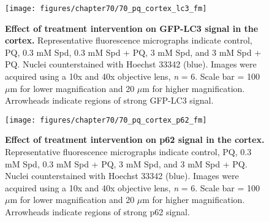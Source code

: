 \begin{landscape}
\begin{figure}[!htbp]
\center
  \texttt{[image: figures/chapter70/70\_pq\_cortex\_lc3\_fm]}
  \caption[Effect of treatment intervention on GFP-LC3 signal in the cortex]{\textbf{Effect of treatment intervention on GFP-LC3 signal in the cortex.} Representative fluorescence micrographs indicate control, PQ, 0.3 mM Spd, 0.3 mM Spd + PQ, 3 mM Spd, and 3 mM Spd + PQ. Nuclei counterstained with Hoechst 33342 (blue). Images were acquired using a 10x and 40x objective lens, \textit{n} = 6. Scale bar = 100 $\mu$m for lower magnification and 20 $\mu$m for higher magnification. Arrowheads indicate regions of strong GFP-LC3 signal.}
  \label{fig:70_pq_cortex_lc3_fm}
\end{figure} 
\end{landscape}

\begin{landscape}
\begin{figure}[!htbp]
\center
  \texttt{[image: figures/chapter70/70\_pq\_cortex\_p62\_fm]}
  \caption[Effect of treatment intervention on p62 signal in the cortex]{\textbf{Effect of treatment intervention on p62 signal in the cortex.} Representative fluorescence micrographs indicate control, PQ, 0.3 mM Spd, 0.3 mM Spd + PQ, 3 mM Spd, and 3 mM Spd + PQ. Nuclei counterstained with Hoechst 33342 (blue). Images were acquired using a 10x and 40x objective lens, \textit{n} = 6. Scale bar = 100 $\mu$m for lower magnification and 20 $\mu$m for higher magnification. Arrowheads indicate regions of strong p62 signal.}
  \label{fig:70_pq_cortex_p62_fm}
\end{figure} 
\end{landscape}

